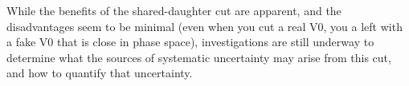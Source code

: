 While the benefits of the shared-daughter cut are apparent,
and the disadvantages seem to be minimal (even when you cut a real V0, you a left with a fake V0 that is close in phase space), investigations are still underway to determine what the sources of systematic uncertainty may arise from this cut, and how to quantify that uncertainty.

%
%
